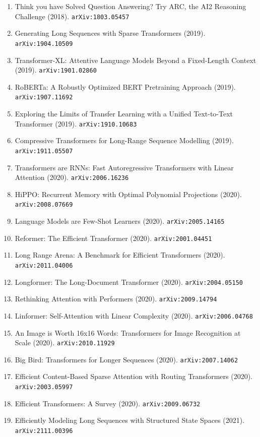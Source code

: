 \documentclass[11pt]{article}
\begin{document}
\begin{enumerate}
  for Sequence Modeling (2018). \texttt{arXiv:1803.01271}
  \item Think you have Solved Question Answering? Try ARC, the AI2 Reasoning
  Challenge (2018). \texttt{arXiv:1803.05457}
  \item Generating Long Sequences with Sparse Transformers (2019). \texttt{arXiv:1904.10509}
  \item Transformer-XL: Attentive Language Models Beyond a Fixed-Length Context (2019). \texttt{arXiv:1901.02860}
  \item RoBERTa: A Robustly Optimized BERT Pretraining Approach (2019). \texttt{arXiv:1907.11692}
  \item Exploring the Limits of Transfer Learning with a Unified Text-to-Text
  Transformer (2019). \texttt{arXiv:1910.10683}
  \item Compressive Transformers for Long-Range Sequence Modelling (2019). \texttt{arXiv:1911.05507}
  \item Transformers are RNNs: Fast Autoregressive Transformers with Linear
  Attention (2020). \texttt{arXiv:2006.16236}
  \item HiPPO: Recurrent Memory with Optimal Polynomial Projections (2020). \texttt{arXiv:2008.07669}
  \item Language Models are Few-Shot Learners (2020). \texttt{arXiv:2005.14165}
  \item Reformer: The Efficient Transformer (2020). \texttt{arXiv:2001.04451}
  \item Long Range Arena: A Benchmark for Efficient Transformers (2020). \texttt{arXiv:2011.04006}
  \item Longformer: The Long-Document Transformer (2020). \texttt{arXiv:2004.05150}
  \item Rethinking Attention with Performers (2020). \texttt{arXiv:2009.14794}
  \item Linformer: Self-Attention with Linear Complexity (2020). \texttt{arXiv:2006.04768}
  \item An Image is Worth 16x16 Words: Transformers for Image Recognition at
  Scale (2020). \texttt{arXiv:2010.11929}
  \item Big Bird: Transformers for Longer Sequences (2020). \texttt{arXiv:2007.14062}
  \item Efficient Content-Based Sparse Attention with Routing Transformers (2020). \texttt{arXiv:2003.05997}
  \item Efficient Transformers: A Survey (2020). \texttt{arXiv:2009.06732}
  \item Efficiently Modeling Long Sequences with Structured State Spaces (2021). \texttt{arXiv:2111.00396}

\end{enumerate}
\end{document}
